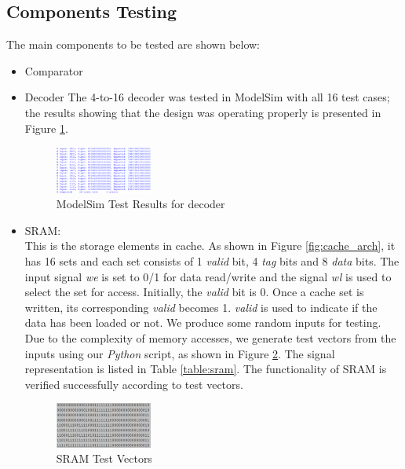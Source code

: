 \documentclass[conference]{IEEEtran}
\begin{document}
\subsection{Components Testing}\label{subsec:comp_test}
The main components to be tested are shown below:
\begin{itemize}
\item Comparator
\item Decoder
The 4-to-16 decoder was tested in ModelSim with all 16 test cases; the results showing that the design was operating properly is presented in Figure \ref{fig:decoder_test}.

\begin{figure}[h!]
  \centering
    \includegraphics[width=0.3\textwidth]{decoder_test}
  \caption{ModelSim Test Results for decoder}
  \label{fig:decoder_test}
\end{figure}
 
\item SRAM: \\

This is the storage elements in cache. As shown in Figure \ref{fig:cache_arch}, it has 16 sets and each set consists of 1 \textit{valid} bit, 4 \textit{tag} bits and 8 \textit{data} bits. The input signal \textit{we} is set to 0/1 for data read/write and the signal \textit{wl} is used to select the set for access. Initially, the \textit{valid} bit is 0. Once a cache set is written, its corresponding \textit{valid} becomes 1. \textit{valid} is used to indicate if the data has been loaded or not. We produce some random inputs for testing. Due to the complexity of memory accesses, we generate test vectors from the inputs using our \textit{Python} script, as shown in Figure \ref{fig:sram_test}. The signal representation is listed in Table \ref{table:sram}. The functionality of SRAM is verified successfully according to test vectors.

\begin{figure}[h!]
  \centering
    \includegraphics[width=0.3\textwidth]{sram_test.png}
  \caption{SRAM Test Vectors}
  \label{fig:sram_test}
\end{figure}


\end{itemize}
\end{document}

